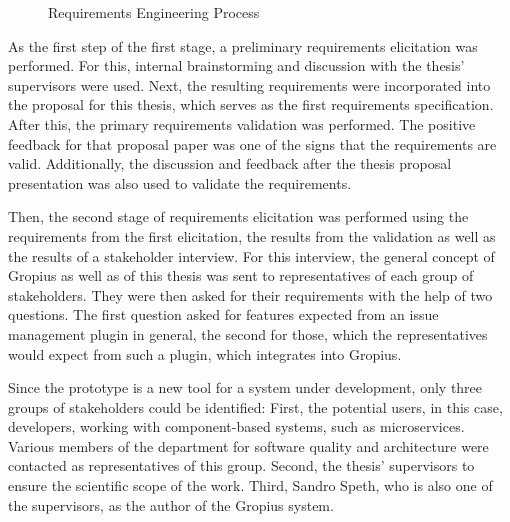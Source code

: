 \begin{figure}[!h]
	\caption{Requirements Engineering Process}
	\label{fig:requirmentsProcess}
\end{figure}

As the first step of the first stage, a preliminary requirements elicitation was performed. 
For this, internal brainstorming and discussion with the thesis' supervisors were used.
Next, the resulting requirements were incorporated into the proposal for this thesis, 
which serves as the first requirements specification.
After this, the primary requirements validation was performed. 
The positive feedback for that proposal paper was one of the signs that the requirements are valid.
Additionally, the discussion and feedback after the thesis proposal presentation was also used to validate the requirements.

Then, the second stage of requirements elicitation was performed using the requirements from the first elicitation, 
the results from the validation as well as the results of a stakeholder interview.
For this interview, the general concept of Gropius as well as of this thesis was sent to representatives of each group of stakeholders. 
They were then asked for their requirements with the help of two questions.
The first question asked for features expected from an issue management plugin in general,
the second for those, which the representatives would expect from such a plugin, which integrates into \gls{Gropius}.

Since the prototype is a new tool for a system under development, only three groups of stakeholders could be identified:
First, the potential users, in this case, developers, working with component-based systems, such as microservices.
Various members of the department for software quality and architecture were contacted as representatives of this group.
Second, the thesis' supervisors to ensure the scientific scope of the work. 
Third, Sandro Speth, who is also one of the supervisors, as the author of the \gls{Gropius} system.

